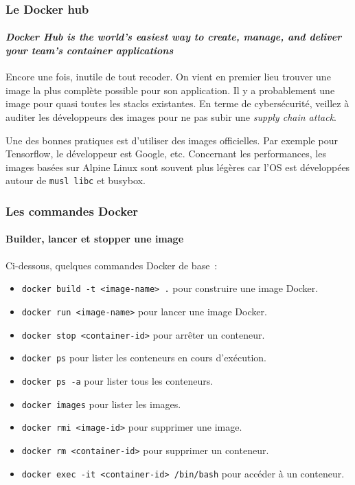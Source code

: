\documentclass{beamer}
\begin{document}
    \begin{frame}
        \transdissolve
        \frametitle{Le Docker hub}
        \framesubtitle{\textit{Docker Hub is the world's easiest way to create, manage, and deliver your team's container applications}}
        Encore une fois, inutile de tout recoder.
        On vient en premier lieu trouver une image la plus complète possible pour son application.
        \bigbreak
        Il y a probablement une image pour quasi toutes les stacks existantes.
        \bigbreak
        En terme de cybersécurité, veillez à auditer les développeurs des images pour ne pas subir une \textit{supply chain attack}.

        Une des bonnes pratiques est d'utiliser des images officielles.
        Par exemple pour Tensorflow, le développeur est Google, etc.
        \bigbreak
        Concernant les performances, les images basées sur Alpine Linux sont souvent plus légères car l'OS est développées autour de \lstinline{musl libc} et busybox.
    \end{frame}

    \begin{frame}
        \transdissolve
        \frametitle{Les commandes Docker}
        \framesubtitle{Builder, lancer et stopper une image}
        Ci-dessous, quelques commandes Docker de base~:
        \begin{itemize}
            \item \lstinline{docker build -t <image-name> .} pour construire une image Docker.
            \item \lstinline{docker run <image-name>} pour lancer une image Docker.
            \item \lstinline{docker stop <container-id>} pour arrêter un conteneur.
            \item \lstinline{docker ps} pour lister les conteneurs en cours d'exécution.
            \item \lstinline{docker ps -a} pour lister tous les conteneurs.
            \item \lstinline{docker images} pour lister les images.
            \item \lstinline{docker rmi <image-id>} pour supprimer une image.
            \item \lstinline{docker rm <container-id>} pour supprimer un conteneur.
            \item \lstinline{docker exec -it <container-id> /bin/bash} pour accéder à un conteneur.
        \end{itemize}
    \end{frame}
\end{document}
